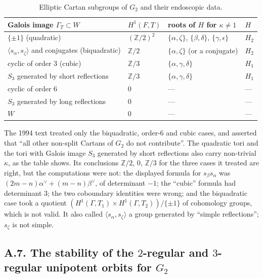 \documentclass[12pt,letterpaper]{amsart}
\makeatletter
\theoremstyle{plain}
\theoremstyle{definition}
\newcommand{\fixedlabel}[1]{\phantomsection\def\@currentlabel{#1}}
\theoremstyle{remark}
\theoremstyle{definition}
\newcommand{\zzz}{\mathbb{Z}}
\makeatother
\begin{document}
\begin{table}[ht]
\renewcommand{\thetable}{A.6}\caption{Elliptic Cartan subgroups of $G_2$ and their endoscopic data.}
\label{tab:A.6}
\renewcommand{\arraystretch}{1.15}
\begin{tabular}{@{}llll@{}}
\toprule
Galois image $\Gamma_T\subset W$ & $H^1(F,T)$ & roots of $H$ for $\kappa\neq1$ & $H$\\
\midrule
$\{\pm1\}$ (quadratic) & $(\zzz/2)^2$ & $\{\alpha,\zeta\}$, $\{\beta,\delta\}$, $\{\gamma,\epsilon\}$ & $H_2$\\
$\langle s_\alpha,s_\zeta\rangle$ and conjugates (biquadratic) & $\zzz/2$ & $\{\alpha,\zeta\}$ (or a conjugate) & $H_2$\\
cyclic of order $3$ (cubic) & $\zzz/3$ & $\{\alpha,\gamma,\delta\}$ & $H_1$\\
$S_3$ generated by short reflections & $\zzz/3$ & $\{\alpha,\gamma,\delta\}$ & $H_1$\\
cyclic of order $6$ & $0$ & --- & ---\\
$S_3$ generated by long reflections & $0$ & --- & ---\\
$W$ & $0$ & --- & ---\\
\bottomrule
\end{tabular}
\end{table}

\begin{rem26}\label{rem:A6}
The 1994 text treated only the biquadratic, order-$6$ and cubic cases, and
asserted that ``all other non-split Cartans of $G_2$ do not contribute''.
The quadratic tori and the tori with Galois image $S_3$ generated by short
reflections also carry non-trivial $\kappa$, as the table shows. Its
conclusions $\zzz/2$, $0$, $\zzz/3$ for the three cases it treated are
right, but the computations were not: the displayed formula for
$s_\beta s_\alpha$ was $(2m-n)\alpha^\vee+(m-n)\beta^\vee$, of determinant
$-1$; the ``cubic'' formula had determinant $3$; the two coboundary
identities were wrong; and the biquadratic case took a quotient
$(H^1(\Gamma,T_1)\times H^1(\Gamma,T_2))/\{\pm1\}$ of cohomology groups, which
is not valid. It also called $\langle s_\alpha,s_\zeta\rangle$ a group
generated by ``simple reflections''; $s_\zeta$ is not simple.
\end{rem26}

\subsection*{A.7. The stability of the \texorpdfstring{$2$-regular and $3$-regular
unipotent orbits for $G_2$}{2-regular and 3-regular unipotent orbits for G2}}\fixedlabel{A.7}\label{sec:A7}
\end{document}
